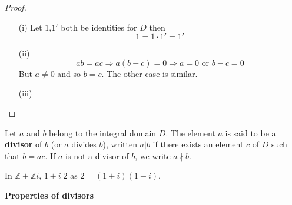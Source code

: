 \begin{proof}
\begin{enumerate}
\item[(i)] Let $1$,$1'$ both be identities for $D$ then
$$1=1\cdot1'=1'$$
\item[(ii)] $$ab=ac \Rightarrow a(b-c)=0 \Rightarrow a=0 \text{ or } b-c=0$$
But $a \neq 0$ and so $b=c$. The other case is similar.
\item[(iii)]
\end{enumerate}

\end{proof}
\begin{definition} Let $a$ and $b$ belong to the integral domain $D$. The element $a$ is said to be a {\bf divisor} of $b$ (or $a$ divides $b$), written $a | b$ if there exists an element $c$ of $D$ such that $b=ac$. If $a$ is not a divisor of $b$, we write $a \nmid b$.
\end{definition}
\begin{example} In $\mathbb{Z}+\mathbb{Z}i$, $1+i | 2$ as $2=(1+i)(1-i)$.
\end{example}

\begin{center} 
{\bf Properties of divisors}
\end{center}

